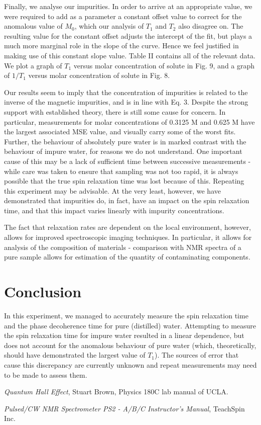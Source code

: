 \documentclass[aps,prl,nofootinbib,twocolumn,superscriptaddress,groupedaddress]{revtex4}  %
\begin{document}
Finally, we analyse our impurities. In order to arrive at an appropriate value, we were required to add as a parameter a constant offset value to correct for the anomalous value of $M_{0}$, which our analysis of $T_{1}$ and $T_{2}$ also disagree on. The resulting value for the constant offset adjusts the intercept of the fit, but plays a much more marginal role in the slope of the curve. Hence we feel justified in making use of this constant slope value. Table II contains all of the relevant data. We plot a graph of $T_{1}$ versus molar concentration of solute in Fig. 9, and a graph of $1/T_{1}$ versus molar concentration of solute in Fig. 8.

Our results seem to imply that the concentration of impurities is related to the inverse of the magnetic impurities, and is in line with Eq. 3. Despite the strong support with established theory, there is still some cause for concern. In particular, measurements for molar concentrations of 0.3125 M and 0.625 M have the largest associated MSE value, and visually carry some of the worst fits. Further, the behaviour of absolutely pure water is in marked contrast with the behaviour of impure water, for reasons we do not understand. One important cause of this may be a lack of sufficient time between successive measurements - while care was taken to ensure that sampling was not too rapid, it is always possible that the true spin relaxation time was lost because of this. Repeating this experiment may be advisable. At the very least, however, we have demonstrated that impurities do, in fact, have an impact on the spin relaxation time, and that this impact varies linearly with impurity concentrations.

The fact that relaxation rates are dependent on the local environment, however, allows for improved spectroscopic imaging techniques. In particular, it allows for analysis of the composition of materials - comparison with NMR spectra of a pure sample allows for estimation of the quantity of contaminating components. 

\section{Conclusion}
In this experiment, we managed to accurately measure the spin relaxation time and the phase decoherence time for pure (distilled) water. Attempting to measure the spin relaxation time for impure water resulted in a linear dependence, but does not account for the anomalous behaviour of pure water (which, theoretically, should have demonstrated the largest value of $T_{1}$). The sources of error that cause this discrepancy are currently unknown and repeat measurements may need to be made to assess them.

\begin{thebibliography}{2}

    \textit{Quantum Hall Effect}, Stuart Brown, Physics 180C lab manual of UCLA.
    
	\textit{Pulsed/CW NMR Spectrometer PS2 - A/B/C Instructor's Manual}, TeachSpin Inc.

\end{thebibliography}
\end{document}
